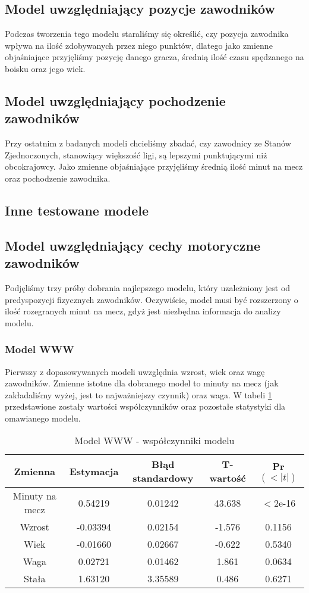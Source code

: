\documentclass[11pt,a4paper]{article}
\begin{document}
\subsection{Model uwzględniający pozycje zawodników}
Podczas tworzenia tego modelu staraliśmy się określić, czy pozycja zawodnika wpływa na ilość zdobywanych przez niego punktów, dlatego jako zmienne objaśniające przyjęliśmy pozycję danego gracza, średnią ilość czasu spędzanego na boisku oraz jego wiek.

\subsection{Model uwzględniający pochodzenie zawodników}
Przy ostatnim z badanych modeli chcieliśmy zbadać, czy zawodnicy ze Stanów Zjednoczonych, stanowiący większość ligi, są lepszymi punktującymi niż obcokrajowcy.
Jako zmienne objaśniające przyjęliśmy średnią ilość minut na mecz oraz pochodzenie zawodnika.

\subsection{Inne testowane modele}
\subsection{Model uwzględniający cechy motoryczne zawodników}
Podjęliśmy trzy próby dobrania najlepszego modelu, który uzależniony jest od predyspozycji fizycznych zawodników. Oczywiście, model musi być rozszerzony o ilość rozegranych minut na mecz, gdyż jest niezbędna informacja do analizy modelu.

\subsubsection{Model WWW}
Pierwszy z dopasowywanych modeli uwzględnia wzrost, wiek oraz wagę zawodników. Zmienne istotne dla dobranego model to minuty na mecz (jak zakładaliśmy wyżej, jest to najważniejszy czynnik) oraz waga. W tabeli \ref{model_www} przedstawione zostały wartości współczynników oraz pozostałe statystyki dla omawianego modelu. 

\begin{table}[H]
	\begin{tabular}{| c | c | c | c | c |}
		\hline
		Zmienna & Estymacja & Błąd standardowy & T-wartość & Pr$(<|t|)$\\ \hline
		Minuty na mecz & 0.54219 & 0.01242 & 43.638 & $<$2e-16\\ \hline
		Wzrost & -0.03394 & 0.02154 & -1.576 & 0.1156\\ \hline
		Wiek & -0.01660 & 0.02667 & -0.622 & 0.5340\\ \hline 
		Waga & 0.02721 & 0.01462 & 1.861 & 0.0634\\ \hline
		Stała & 1.63120 & 3.35589 & 0.486 & 0.6271 \\ \hline
	\end{tabular}
	\caption{Model WWW - współczynniki modelu}
	\label{model_www}
\end{table}
\end{document}

